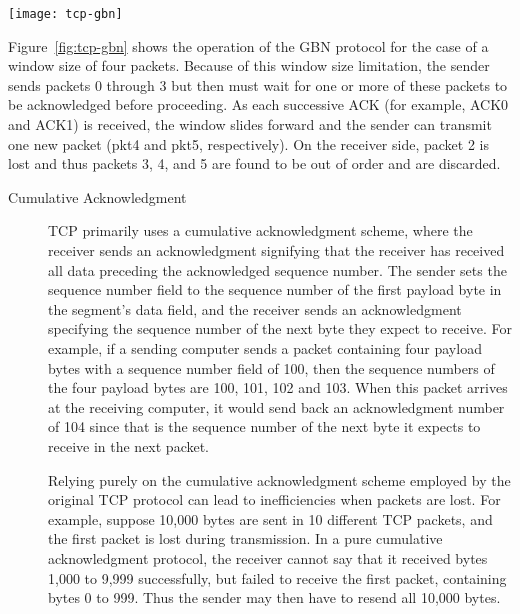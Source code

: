 \begin{minipage}{.5\linewidth}
  \texttt{[image: tcp-gbn]}\label{fig:tcp-gbn}
\end{minipage}\quad
\begin{minipage}{.5\linewidth}
  Figure~\ref{fig:tcp-gbn} shows the operation of the GBN protocol for the case of a
  window size of four packets. Because of this window size limitation, the sender sends
  packets 0 through 3 but then must wait for one or more of these packets to be
  acknowledged before proceeding. As each successive ACK (for example, ACK0 and ACK1) is
  received, the window slides forward and the sender can transmit one new packet (pkt4 and
  pkt5, respectively). On the receiver side, packet 2 is lost and thus packets 3, 4, and 5
  are found to be out of order and are discarded. 
\end{minipage}

\begin{description}
\item[Cumulative Acknowledgment]  TCP primarily uses a cumulative acknowledgment scheme, where
  the receiver sends an acknowledgment signifying that the receiver has received all data
  preceding the acknowledged sequence number. The sender sets the sequence number field to
  the sequence number of the first payload byte in the segment's data field, and the
  receiver sends an acknowledgment specifying the sequence number of the next byte they
  expect to receive. For example, if a sending computer sends a packet containing four
  payload bytes with a sequence number field of 100, then the sequence numbers of the four
  payload bytes are 100, 101, 102 and 103. When this packet arrives at the receiving
  computer, it would send back an acknowledgment number of 104 since that is the sequence
  number of the next byte it expects to receive in the next packet.

  Relying purely on the cumulative acknowledgment scheme employed by the original TCP
  protocol can lead to inefficiencies when packets are lost. For example, suppose 10,000
  bytes are sent in 10 different TCP packets, and the first packet is lost during
  transmission. In a pure cumulative acknowledgment protocol, the receiver cannot say that
  it received bytes 1,000 to 9,999 successfully, but failed to receive the first packet,
  containing bytes 0 to 999. Thus the sender may then have to resend all 10,000
  bytes. 
\end{description}

